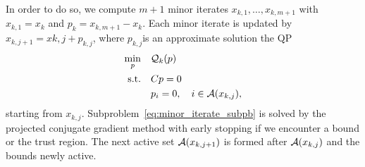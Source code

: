 \documentclass[10pt]{article}
\begin{document}
	In order to do so, we compute $m+1$ minor iterates $x_{k,1}, \ldots, x_{k,m+1}$ with $x_{k,1}=x_k$ and $p_k=x_{k,m+1}-x_k$. Each minor iterate is updated by $x_{k,j+1}=x{k,j}+p_{k,j}$, where $p_{k,j}$is an approximate solution the QP
	\begin{equation}\label{eq:minor_iterate_subpb}
		\begin{aligned}
			\min_{p} \quad& {\mathcal{Q}}_k(p)  \\
			\text{s.t.}  \quad &  Cp=0\\
			& p_i=0,\quad i\in {\mathcal{A}}(x_{k,j}),
		\end{aligned}	
	\end{equation}
	starting from $x_{k,j}$. Subproblem~\eqref{eq:minor_iterate_subpb} is solved by the projected conjugate gradient method with early stopping if we encounter a bound or the trust region. The next active set ${\mathcal{A}}(x_{k,j+1})$ is formed after ${\mathcal{A}}(x_{k,j})$ and the bounds newly active.  
	\clearpage
	
	
	
	
\end{document}
